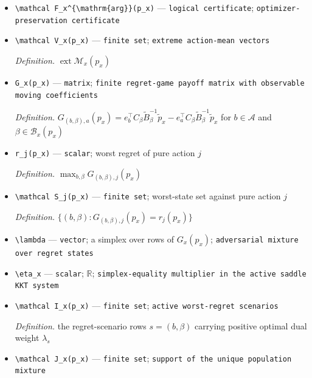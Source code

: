 \documentclass{article}
\begin{document}
\begin{itemize}
  \item \texttt{\textbackslash{}\allowbreak{}mathcal F\_\allowbreak{}x\textasciicircum{}\{\textbackslash{}\allowbreak{}mathrm\{arg\}\allowbreak{}\}\allowbreak{}(p\_\allowbreak{}x)} --- \texttt{logical certificate}; \texttt{optimizer-\allowbreak{}preservation certificate}
  \item \texttt{\textbackslash{}\allowbreak{}mathcal V\_\allowbreak{}x(p\_\allowbreak{}x)} --- \texttt{finite set}; \texttt{extreme action-\allowbreak{}mean vectors}
  \par\smallskip\noindent\emph{Definition.} \(\operatorname{ext}\mathcal M_x(p_x)\)
  \item \texttt{G\_\allowbreak{}x(p\_\allowbreak{}x)} --- \texttt{matrix}; \texttt{finite regret-\allowbreak{}game payoff matrix with observable moving coefficients}
  \par\smallskip\noindent\emph{Definition.} \(G_{(b,\beta),a}(p_x)=e_b^\top C_\beta\widetilde B_\beta^{-1}\widetilde p_x-e_a^\top C_\beta\widetilde B_\beta^{-1}\widetilde p_x\) for \(b\in\mathcal A\) and \(\beta\in\mathcal B_x(p_x)\)
  \item \texttt{r\_\allowbreak{}j(p\_\allowbreak{}x)} --- \texttt{scalar}; worst regret of pure action \(j\)
  \par\smallskip\noindent\emph{Definition.} \(\max_{b,\beta}G_{(b,\beta),j}(p_x)\)
  \item \texttt{\textbackslash{}\allowbreak{}mathcal S\_\allowbreak{}j(p\_\allowbreak{}x)} --- \texttt{finite set}; worst-state set against pure action \(j\)
  \par\smallskip\noindent\emph{Definition.} \(\{(b,\beta):G_{(b,\beta),j}(p_x)=r_j(p_x)\}\)
  \item \texttt{\textbackslash{}\allowbreak{}lambda} --- \texttt{vector}; a simplex over rows of \(G_x(p_x)\); \texttt{adversarial mixture over regret states}
  \item \texttt{\textbackslash{}\allowbreak{}eta\_\allowbreak{}x} --- \texttt{scalar}; \(\mathbb R\); \texttt{simplex-\allowbreak{}equality multiplier in the active saddle KKT system}
  \item \texttt{\textbackslash{}\allowbreak{}mathcal I\_\allowbreak{}x(p\_\allowbreak{}x)} --- \texttt{finite set}; \texttt{active worst-\allowbreak{}regret scenarios}
  \par\smallskip\noindent\emph{Definition.} the regret-scenario rows \(s=(b,\beta)\) carrying positive optimal dual weight \(\lambda_s\)
  \item \texttt{\textbackslash{}\allowbreak{}mathcal J\_\allowbreak{}x(p\_\allowbreak{}x)} --- \texttt{finite set}; \texttt{support of the unique population mixture}

\end{itemize}
\end{document}
